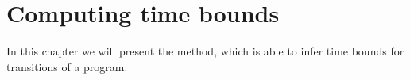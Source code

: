\section{Computing time bounds}

In this chapter we will present the method, which is able to infer time bounds for transitions of a program.


